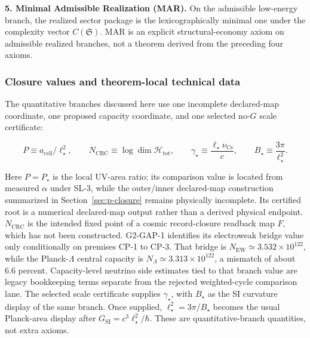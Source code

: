 \textbf{5. Minimal Admissible Realization (MAR).} On the admissible low-energy branch, the realized sector package is the lexicographically minimal one under the complexity vector \(C(\mathfrak S)\). MAR is an explicit structural-economy axiom on admissible realized branches, not a theorem derived from the preceding four axioms.

\subsubsection{Closure values and theorem-local technical data}\label{14-assumptions-and-external-inputs}

The quantitative branches discussed here use one incomplete declared-map coordinate, one proposed
capacity coordinate, and one selected no-\(G\) scale certificate:

\[
P \equiv a_{\mathrm{cell}}/\ell_\star^2,
\qquad
N_{\mathrm{CRC}} \equiv \log \dim \mathcal H_{\mathrm{tot}},
\qquad
\gamma_\star\equiv\frac{\ell_\star\nu_{\mathrm{Cs}}}{c},
\qquad
B_\star\equiv\frac{3\pi}{\ell_\star^2}.
\]

Here \(P=P_\star\) is the local UV-area ratio; its comparison value is located from
measured \(\alpha\) under SL-3, while the outer/inner declared-map
construction summarized in
Section~\ref{sec:p-closure} remains physically incomplete. Its certified root is a numerical
declared-map output rather than a derived physical endpoint. \(N_{\mathrm{CRC}}\) is the intended
fixed point of a cosmic record-closure readback map \(F\), which has not been constructed.
G2-GAP-1 identifies its electroweak bridge value only conditionally on premises CP-1 to CP-3.
That bridge is \(N_{\mathrm{EW}}\simeq3.532\times10^{122}\), while the
Planck-\(\Lambda\) central capacity is \(N_\Lambda\simeq3.313\times10^{122}\), a mismatch of
about \(6.6\) percent. Capacity-level
neutrino side estimates tied to that branch value are legacy bookkeeping terms separate from the
rejected weighted-cycle comparison lane.
The selected scale certificate supplies \(\gamma_\star\), with \(B_\star\) as the SI curvature
display of the same branch. Once supplied, \(\ell_\star^2=3\pi/B_\star\) becomes the usual
Planck-area display after \(G_{\mathrm{SI}}=c^3\ell_\star^2/\hbar\).
These are quantitative-branch quantities, not extra axioms.


